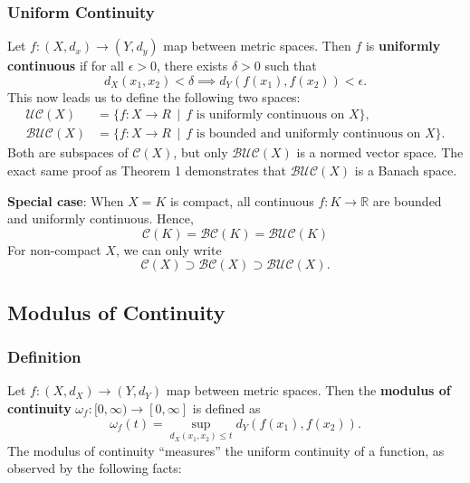 \documentclass[11pt]{article}
\begin{document}
\subsubsection*{Uniform Continuity}

Let $f : (X, d_{x}) \to (Y, d_{y})$ map between metric spaces. Then $f$ is \textbf{uniformly continuous} if for all $\epsilon > 0$, there exists $\delta > 0$ such that
\[
	d_{X}(x_{1}, x_{2}) < \delta \implies d_{Y}(f(x_{1}), f(x_{2})) < \epsilon.
\]
This now leads us to define the following two spaces:
\begin{align*}
	\mathcal{UC}(X) &= \{ f : X \to R \, \mid \, f \text{ is uniformly continuous on } X \}, \\
	\mathcal{BUC}(X) &= \{ f : X \to R \, \mid \, f \text{ is bounded and uniformly continuous on } X \}.
\end{align*}
Both are subspaces of $\mathcal{C}(X)$, but only $\mathcal{BUC}(X)$ is a normed vector space. The exact same proof as Theorem 1 demonstrates that $\mathcal{BUC}(X)$ is a Banach space.

\textbf{Special case}: When $X = K$ is compact, all continuous $f : K \to \mathbb{R}$ are bounded and uniformly continuous. Hence,
\[
	\mathcal{C}(K) = \mathcal{BC}(K) = \mathcal{BUC}(K)
\]
For non-compact $X$, we can only write 
\[
	\mathcal{C}(X) \supset \mathcal{BC}(X) \supset \mathcal{BUC}(X).
\]


\subsection{Modulus of Continuity}


\subsubsection*{Definition}

Let $f : (X, d_{X}) \to (Y, d_{Y})$ map between metric spaces. Then the \textbf{modulus of continuity} $\omega_{f} : [0, \infty) \to [0, \infty]$ is defined as
\[
	\omega_{f}(t) = \sup\limits_{d_{X}(x_{1}, x_{2}) \le t} d_{Y}(f(x_{1}), f(x_{2})).
\]
The modulus of continuity ``measures'' the uniform continuity of a function, as observed by the following facts:

\newpage
\end{document}
